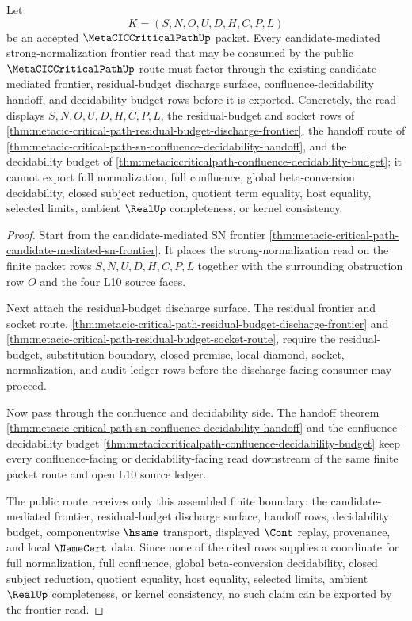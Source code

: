 \begin{theorem}
\label{thm:metacic-critical-path-candidate-mediated-sn-frontier-exhaustion}
Let
$$
K=(S,N,O,U,D,H,C,P,L)
$$
be an accepted $\MetaCICCriticalPathUp$ packet. Every candidate-mediated strong-normalization frontier read that may be consumed by the public $\MetaCICCriticalPathUp$ route must factor through the existing candidate-mediated frontier, residual-budget discharge surface, confluence-decidability handoff, and decidability budget rows before it is exported. Concretely, the read displays $S,N,O,U,D,H,C,P,L$, the residual-budget and socket rows of \autoref{thm:metacic-critical-path-residual-budget-discharge-frontier}, the handoff route of \autoref{thm:metacic-critical-path-sn-confluence-decidability-handoff}, and the decidability budget of \autoref{thm:metaciccriticalpath-confluence-decidability-budget}; it cannot export full normalization, full confluence, global beta-conversion decidability, closed subject reduction, quotient term equality, host equality, selected limits, ambient $\RealUp$ completeness, or kernel consistency.
\end{theorem}
\begin{proof}
Start from the candidate-mediated SN frontier \autoref{thm:metacic-critical-path-candidate-mediated-sn-frontier}. It places the strong-normalization read on the finite packet rows $S,N,U,D,H,C,P,L$ together with the surrounding obstruction row $O$ and the four L10 source faces.

Next attach the residual-budget discharge surface. The residual frontier and socket route, \autoref{thm:metacic-critical-path-residual-budget-discharge-frontier} and \autoref{thm:metacic-critical-path-residual-budget-socket-route}, require the residual-budget, substitution-boundary, closed-premise, local-diamond, socket, normalization, and audit-ledger rows before the discharge-facing consumer may proceed.

Now pass through the confluence and decidability side. The handoff theorem \autoref{thm:metacic-critical-path-sn-confluence-decidability-handoff} and the confluence-decidability budget \autoref{thm:metaciccriticalpath-confluence-decidability-budget} keep every confluence-facing or decidability-facing read downstream of the same finite packet route and open L10 source ledger.

The public route receives only this assembled finite boundary: the candidate-mediated frontier, residual-budget discharge surface, handoff rows, decidability budget, componentwise $\hsame$ transport, displayed $\Cont$ replay, provenance, and local $\NameCert$ data. Since none of the cited rows supplies a coordinate for full normalization, full confluence, global beta-conversion decidability, closed subject reduction, quotient equality, host equality, selected limits, ambient $\RealUp$ completeness, or kernel consistency, no such claim can be exported by the frontier read.
\end{proof}

